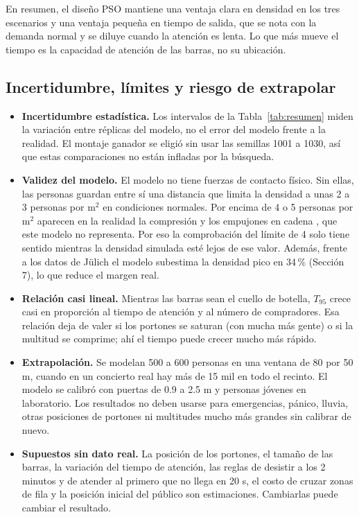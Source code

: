 \documentclass[11pt,letterpaper]{article}
\begin{document}
En resumen, el diseño PSO mantiene una ventaja clara en densidad en los tres escenarios y una ventaja pequeña en tiempo de salida, que se nota con la demanda normal y se diluye cuando la atención es lenta. Lo que más mueve el tiempo es la capacidad de atención de las barras, no su ubicación.

\subsection{Incertidumbre, límites y riesgo de extrapolar}
\label{sec:limites}
\begin{itemize}
\item \textbf{Incertidumbre estadística.} Los intervalos de la Tabla~\ref{tab:resumen} miden la variación entre réplicas del modelo, no el error del modelo frente a la realidad. El montaje ganador se eligió sin usar las semillas 1001 a 1030, así que estas comparaciones no están infladas por la búsqueda.
\item \textbf{Validez del modelo.} El modelo no tiene fuerzas de contacto físico. Sin ellas, las personas guardan entre sí una distancia que limita la densidad a unas 2 a 3 personas por m$^2$ en condiciones normales. Por encima de 4 o 5 personas por m$^2$ aparecen en la realidad la compresión y los empujones en cadena \citep{helbing2007}, que este modelo no representa. Por eso la comprobación del límite de 4 solo tiene sentido mientras la densidad simulada esté lejos de ese valor. Además, frente a los datos de Jülich el modelo subestima la densidad pico en 34\,\% (Sección 7), lo que reduce el margen real.
\item \textbf{Relación casi lineal.} Mientras las barras sean el cuello de botella, $T_{95}$ crece casi en proporción al tiempo de atención y al número de compradores. Esa relación deja de valer si los portones se saturan (con mucha más gente) o si la multitud se comprime; ahí el tiempo puede crecer mucho más rápido.
\item \textbf{Extrapolación.} Se modelan 500 a 600 personas en una ventana de 80 por 50 m, cuando en un concierto real hay más de 15 mil en todo el recinto. El modelo se calibró con puertas de 0.9 a 2.5 m y personas jóvenes en laboratorio. Los resultados no deben usarse para emergencias, pánico, lluvia, otras posiciones de portones ni multitudes mucho más grandes sin calibrar de nuevo.
\item \textbf{Supuestos sin dato real.} La posición de los portones, el tamaño de las barras, la variación del tiempo de atención, las reglas de desistir a los 2 minutos y de atender al primero que no llega en 20 s, el costo de cruzar zonas de fila y la posición inicial del público son estimaciones. Cambiarlas puede cambiar el resultado.
\end{itemize}
\end{document}
